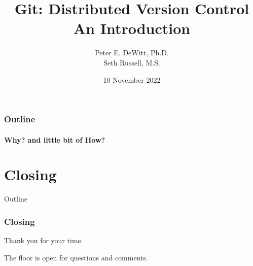 {}


\author{Peter E. DeWitt, Ph.D.\\Seth Russell, M.S.}
\title[Intro to Git]{Git: Distributed Version Control \\ {\small An
Introduction}}
\date{10 November 2022}


 
  \watermarkoff

  \begin{frame}[t,plain]
    \titlepage
  \end{frame}

  \begin{frame}[t]
    \frametitle{Outline}
    \framesubtitle{Why? and little bit of How?}
    \tableofcontents[hideallsubsections] 
  \end{frame}

   
  
  
  


  \section{Closing}
  \begin{frame}[t]{Outline}
  \end{frame}

  \begin{frame}[t] 
    \frametitle{Closing}
    \begin{center}
    Thank you for your time.

    \vspace{1in}

    The floor is open for questions and comments.
    \end{center} 
  \end{frame}



